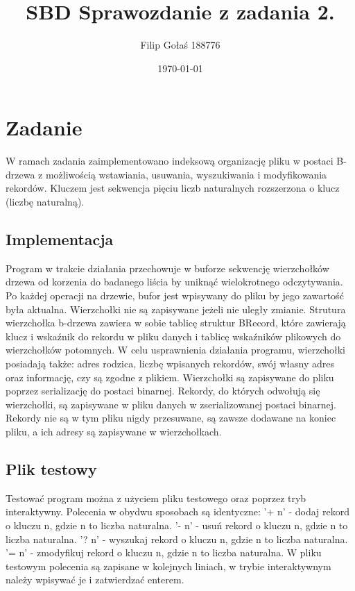 \documentclass{article}
\title{SBD Sprawozdanie z zadania 2.}
\author{Filip Gołaś 188776}
\date{\today}
\begin{document}
    \maketitle
    \section{Zadanie}

    W ramach zadania zaimplementowano indeksową organizację pliku w postaci B-drzewa
    z możliwością wstawiania, usuwania, wyszukiwania i modyfikowania rekordów.
    Kluczem jest sekwencja pięciu liczb naturalnych rozszerzona
    o klucz (liczbę naturalną).

    \subsection{Implementacja}

    Program w trakcie działania przechowuje w buforze sekwencję wierzchołków 
    drzewa od korzenia do badanego liścia by uniknąć wielokrotnego odczytywania.
    Po każdej operacji na drzewie, bufor jest wpisywany do pliku by jego zawartość
    była aktualna. Wierzchołki nie są zapisywane jeżeli nie uległy zmianie.
    Strutura wierzchołka b-drzewa zawiera w sobie tablicę struktur BRecord, które
    zawierają klucz i wskaźnik do rekordu w pliku danych i tablicę wskaźników plikowych
    do wierzchołków potomnych. W celu usprawnienia działania programu, wierzchołki
    posiadają także: adres rodzica, liczbę wpisanych rekordów, swój własny adres
    oraz informację, czy są zgodne z plikiem. Wierzchołki są zapisywane do 
    pliku poprzez serializację do postaci binarnej. 
    Rekordy, do których odwołują się wierzchołki, są zapisywane w pliku danych
    w zserializowanej postaci binarnej. Rekordy nie są w tym pliku nigdy przesuwane, 
    są zawsze dodawane na koniec pliku, a ich adresy są zapisywane w wierzchołkach.

    \subsection{Plik testowy}
    Testować program można z użyciem pliku testowego oraz poprzez tryb interaktywny.
    Polecenia w obydwu sposobach są identyczne:
    '+ n' - dodaj rekord o kluczu n, gdzie n to liczba naturalna.
    '- n' - usuń rekord o kluczu n, gdzie n to liczba naturalna.
    '? n' - wyszukaj rekord o kluczu n, gdzie n to liczba naturalna.
    '= n' - zmodyfikuj rekord o kluczu n, gdzie n to liczba naturalna.
    W pliku testowym polecenia są zapisane w kolejnych liniach, w trybie interaktywnym
    należy wpisywać je i zatwierdzać enterem.
\end{document}

